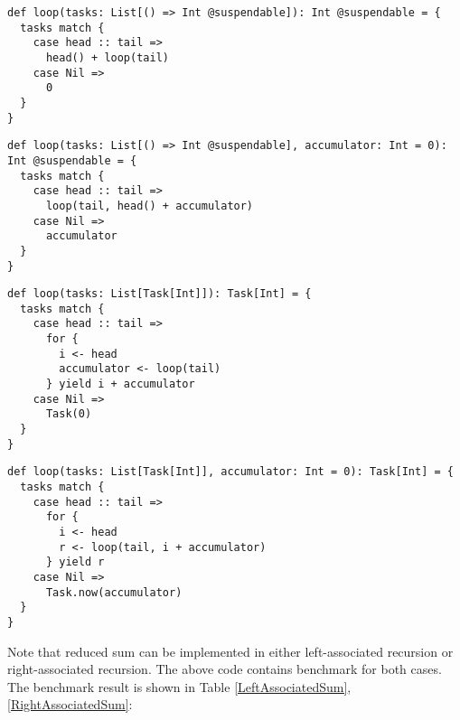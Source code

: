 \begin{lstlisting}[float=htbp,caption={Left-associated sum based on Scala Continuation plug-in},label={LeftAssociatedSum.scalaContinuation}]
def loop(tasks: List[() => Int @suspendable]): Int @suspendable = {
  tasks match {
    case head :: tail =>
      head() + loop(tail)
    case Nil =>
      0
  }
}
\end{lstlisting}

\begin{lstlisting}[float=htbp,caption={Right-associated sum based on Scala Continuation plug-in},label={RightAssociatedSum.scalaContinuation}]
def loop(tasks: List[() => Int @suspendable], accumulator: Int = 0): Int @suspendable = {
  tasks match {
    case head :: tail =>
      loop(tail, head() + accumulator)
    case Nil =>
      accumulator
  }
}
\end{lstlisting}

\begin{lstlisting}[float=htbp,caption={Left-associated sum based on \lstinline{for} comprehension},label={LeftAssociatedSum.scalaz}]
def loop(tasks: List[Task[Int]]): Task[Int] = {
  tasks match {
    case head :: tail =>
      for {
        i <- head
        accumulator <- loop(tail)
      } yield i + accumulator
    case Nil =>
      Task(0)
  }
}
\end{lstlisting}

\begin{lstlisting}[float=htbp,caption={Right-associated sum based on \lstinline{for} comprehension},label={RightAssociatedSum.scalaz}]
def loop(tasks: List[Task[Int]], accumulator: Int = 0): Task[Int] = {
  tasks match {
    case head :: tail =>
      for {
        i <- head
        r <- loop(tail, i + accumulator)
      } yield r
    case Nil =>
      Task.now(accumulator)
  }
}
\end{lstlisting}

Note that reduced sum can be implemented in either left-associated recursion or right-associated recursion. The above code contains benchmark for both cases. The benchmark result is shown in Table \ref{LeftAssociatedSum}, \ref{RightAssociatedSum}:

